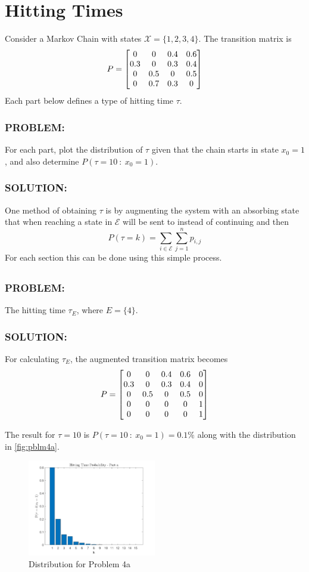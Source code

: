 \documentclass[]{article}
\newcommand{\Problem}{\subsubsection*{\textbf{PROBLEM:}}}
\newcommand{\Solution}{\subsubsection*{\textbf{SOLUTION:}}}
\newcommand{\st}{\ : \ }
\begin{document}
\newpage
\section{Hitting Times} 
Consider a Markov Chain with states $\mathcal{X} = \{1,2,3,4\}$.
The transition matrix is \[
    P = \mqty[
        0   & 0   & 0.4 & 0.6 \\
        0.3 & 0   & 0.3 & 0.4 \\
        0   & 0.5 & 0   & 0.5 \\
        0   & 0.7 & 0.3 & 0 
    ]    
\]
Each part below defines a type of hitting time $\tau$.
\Problem
For each part, plot the distribution of $\tau$ given that the chain starts in state $x_0 = 1$, and also determine $P(\tau = 10 \st x_0 = 1)$.
\Solution
One method of obtaining $\tau$ is by augmenting the system with an absorbing state that when reaching a state in $\mathcal{E}$ will be sent to instead of continuing and then 
\[
    P(\tau = k) = \sum_{i \in \mathcal{E}} \sum_{j=1}^{n} p_{i,j}
\]
For each section this can be done using this simple process.

\subsection{}
\Problem
The hitting time $\tau_E$, where $E = \{4\}$.
\Solution
For calculating $\tau_E$, the augmented transition matrix becomes
\[
    P = \mqty[
        0   & 0   & 0.4 & 0.6 & 0\\
        0.3 & 0   & 0.3 & 0.4 & 0\\
        0   & 0.5 & 0   & 0.5 & 0\\
        0   & 0   & 0   & 0   & 1\\
        0   & 0   & 0   & 0   & 1
    ]    
\]

The result for $\tau = 10$ is $P(\tau = 10 \st x_0 = 1) = 0.1\%$
along with the distribution in \autoref{fig:pblm4a}.
\begin{figure}[h]
    \centering
    \includegraphics[width = 0.5\textwidth]{figs/pblm4a.png}
    \caption{Distribution for Problem 4a}
    \label{fig:pblm4a}
\end{figure}
\end{document}
